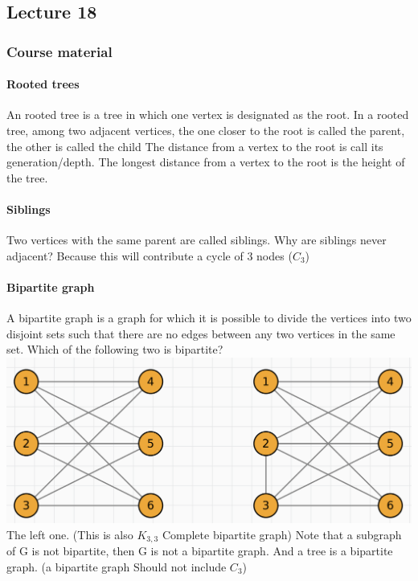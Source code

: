 \documentclass{article}
\begin{document}
\subsection{Lecture 18}
\subsubsection{Course material}
\paragraph{Rooted trees}
An rooted tree is a tree in which one vertex is designated as the root. \newline
In a rooted tree, among two adjacent vertices, the one closer to the root is called the parent, the other is called the child The distance from a vertex to the root is call its generation/depth.\newline
The longest distance from a vertex to the root is the height of the tree.
\paragraph{Siblings}
Two vertices with the same parent are called siblings.\newline
Why are siblings never adjacent?\newline
Because this will contribute a cycle of 3 nodes ($C_3$)
\paragraph{Bipartite graph}
A bipartite graph is a graph for which it is possible to divide the vertices into two disjoint sets such that there are no edges between any two vertices in the same set.\newline
Which of the following two is bipartite?\newline
\includegraphics{0056}\newline
The left one. (This is also $K_{3,3}$ Complete bipartite graph)\newline
Note that a subgraph of G is not bipartite, then G is not a bipartite graph.\newline
And a tree is a bipartite graph. (a bipartite graph Should not include $C_3$)
\end{document}
